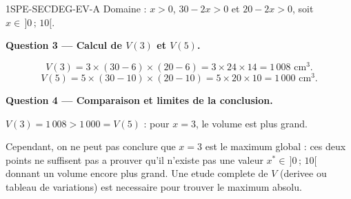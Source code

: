 \begin{corrige}{1SPE-SECDEG-EV-A}
Domaine : $x > 0$, $30 - 2x > 0$ et $20 - 2x > 0$, soit $x \in \,]0\,;\,10[$.

\medskip
\textbf{Question 3 — Calcul de $V(3)$ et $V(5)$.}


\[
V(3) = 3 \times (30-6) \times (20-6) = 3 \times 24 \times 14 = 1\,008 \text{ cm}^3.
\]
\[
V(5) = 5 \times (30-10) \times (20-10) = 5 \times 20 \times 10 = 1\,000 \text{ cm}^3.
\]

\medskip
\textbf{Question 4 — Comparaison et limites de la conclusion.}

$V(3) = 1\,008 > 1\,000 = V(5)$ : pour $x = 3$, le volume est plus grand.

Cependant, on ne peut pas conclure que $x = 3$ est le maximum global : ces deux points ne suffisent pas a prouver qu'il n'existe pas une valeur $x^* \in \,]0\,;\,10[$ donnant un volume encore plus grand. Une etude complete de $V$ (derivee ou tableau de variations) est necessaire pour trouver le maximum absolu.

\end{corrige}
